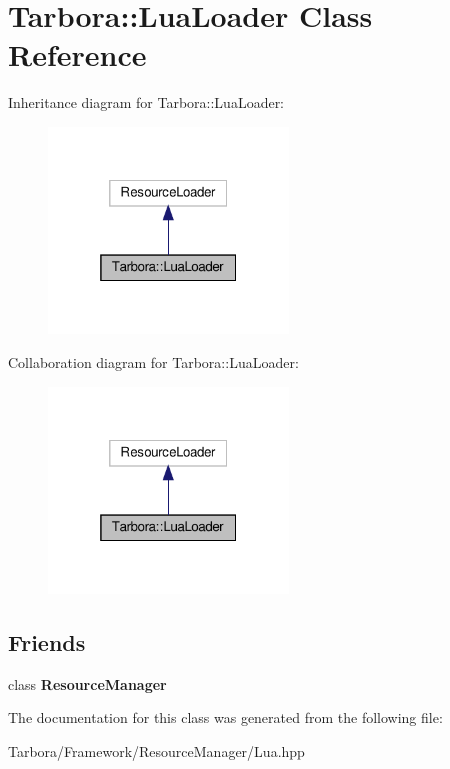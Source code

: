 \hypertarget{classTarbora_1_1LuaLoader}{}\section{Tarbora\+:\+:Lua\+Loader Class Reference}
\label{classTarbora_1_1LuaLoader}


Inheritance diagram for Tarbora\+:\+:Lua\+Loader\+:\nopagebreak
\begin{figure}[H]
\begin{center}
\leavevmode
\includegraphics[width=181pt]{classTarbora_1_1LuaLoader__inherit__graph}
\end{center}
\end{figure}


Collaboration diagram for Tarbora\+:\+:Lua\+Loader\+:\nopagebreak
\begin{figure}[H]
\begin{center}
\leavevmode
\includegraphics[width=181pt]{classTarbora_1_1LuaLoader__coll__graph}
\end{center}
\end{figure}
\subsection*{Friends}
\begin{DoxyCompactItemize}
\item 
\mbox{\label{classTarbora_1_1LuaLoader_a54c1252abc87a78a301e6b6984470408}} 
class {\bfseries Resource\+Manager}
\end{DoxyCompactItemize}


The documentation for this class was generated from the following file\+:\begin{DoxyCompactItemize}
\item 
Tarbora/\+Framework/\+Resource\+Manager/Lua.\+hpp\end{DoxyCompactItemize}
